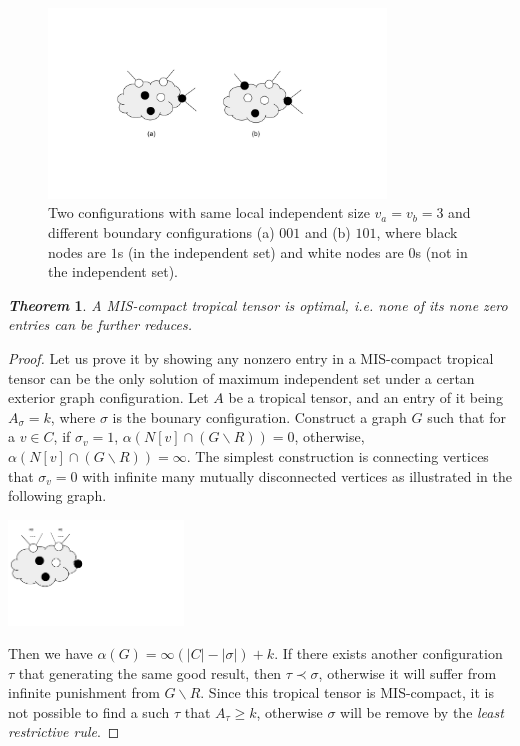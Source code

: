 \documentclass{article}
\newcommand{\<}{\langle}
\renewcommand{\>}{\rangle}
\newtheorem{theorem}{\textit{Theorem}}
\theoremstyle{definition}\newtheorem{definition}{\textit{Definition}}
\begin{document}
\begin{figure}
    \centering
    \includegraphics[width=0.8\textwidth, trim={5cm 4cm 5cm 4cm}, clip]{compressionrule.pdf}
    \caption{Two configurations with same local independent size $v_a = v_b = 3$ and different boundary configurations (a) ${001}$ and (b) ${101}$, where black nodes are $1$s (in the independent set) and white nodes are $0$s (not in the independent set).}\label{fig:compressrule}
\end{figure}

\begin{theorem}
    A MIS-compact tropical tensor is optimal, i.e. none of its none zero entries can be further reduces.
\end{theorem}

\begin{proof}
    Let us prove it by showing any nonzero entry in a MIS-compact tropical tensor can be the only solution of maximum independent set under a certan exterior graph configuration.
    Let $A$ be a tropical tensor, and an entry of it being $A_{\sigma} = k$, where $\sigma$ is the bounary configuration.
    Construct a graph $G$ such that for a $v \in C$, if $\sigma_v=1$, $\alpha(N[v] \cap (G \backslash R)) = 0$, otherwise, $\alpha(N[v] \cap (G\backslash R)) = \infty$.
    The simplest construction is connecting vertices that $\sigma_v=0$ with infinite many mutually disconnected vertices as illustrated in the following graph.

    \centerline{\includegraphics[width=0.35\textwidth, trim={0cm 2cm 6cm 0cm}, clip]{proofoptimal.pdf}}

    Then we have $\alpha(G) = \infty (|C|-|\sigma|) + k$. If there exists another configuration $\tau$ that generating the same good result, then $\tau \prec \sigma$,
    otherwise it will suffer from infinite punishment from $G\backslash R$.
    Since this tropical tensor is MIS-compact, it is not possible to find a such $\tau$ that $A_\tau \geq k$, otherwise $\sigma$ will be remove by the \textit{least restrictive rule}.
\end{proof}
\end{document}
